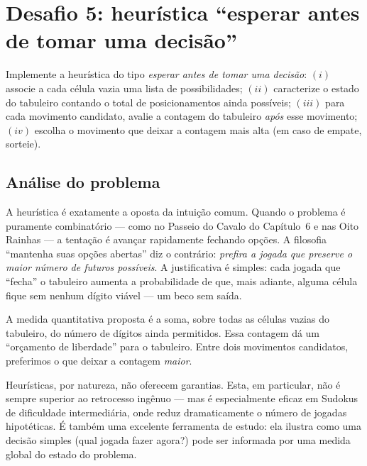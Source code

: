 \documentclass[11pt,a4paper,oneside]{report}
\begin{document}
\section{Desafio 5: heurística ``esperar antes de tomar uma decisão''}

\begin{enunciado}
Implemente a heurística do tipo \emph{esperar antes de tomar uma decisão}:
$(i)$ associe a cada célula vazia uma lista de possibilidades; $(ii)$
caracterize o estado do tabuleiro contando o total de posicionamentos
ainda possíveis; $(iii)$ para cada movimento candidato, avalie a contagem
do tabuleiro \emph{após} esse movimento; $(iv)$ escolha o movimento que
deixar a contagem mais alta (em caso de empate, sorteie).
\end{enunciado}

\subsection{Análise do problema}

A heurística é exatamente a oposta da intuição comum. Quando o problema é
puramente combinatório --- como no Passeio do Cavalo do Capítulo~6 e nas
Oito Rainhas --- a tentação é avançar rapidamente fechando opções. A
filosofia ``mantenha suas opções abertas'' diz o contrário: \emph{prefira
a jogada que preserve o maior número de futuros possíveis}. A justificativa
é simples: cada jogada que ``fecha'' o tabuleiro aumenta a probabilidade
de que, mais adiante, alguma célula fique sem nenhum dígito viável ---
um beco sem saída.

A medida quantitativa proposta é a soma, sobre todas as células vazias do
tabuleiro, do número de dígitos ainda permitidos. Essa contagem dá um
``orçamento de liberdade'' para o tabuleiro. Entre dois movimentos
candidatos, preferimos o que deixar a contagem \emph{maior}.

\begin{engenharia}
Heurísticas, por natureza, não oferecem garantias. Esta, em particular,
não é sempre superior ao retrocesso ingênuo --- mas é especialmente eficaz
em Sudokus de dificuldade intermediária, onde reduz dramaticamente o
número de jogadas hipotéticas. É também uma excelente ferramenta de
estudo: ela ilustra como uma decisão simples (qual jogada fazer agora?)
pode ser informada por uma medida global do estado do problema.
\end{engenharia}
\end{document}
